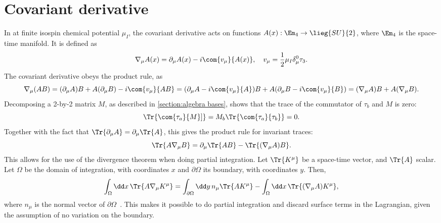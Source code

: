 \section{Covariant derivative}

In \chpt at finite isospin chemical potential $\mu_I$, the covariant derivative acts on functions $A(x): \Em_4 \rightarrow \lieg{SU}{2}$, where $\Em_4$ is the space-time manifold. It is defined as 
\begin{equation}
    \nabla_\mu A(x) = \partial_\mu A(x) - i \com{v_\mu}{A(x)}, 
    \quad v_\mu = \frac{1}{2} \mu_I \delta_\mu^0 \tau_3.
\end{equation}
The covariant derivative obeys the product rule, as
\begin{equation*}
    \nabla_\mu (A B) 
    = (\partial_\mu A) B + A (\partial_\mu B) - i \com{v_\mu}{AB}
    = (\partial_\mu A - i \com{v_\mu}{A})B + A(\partial_\mu B- i \com{v_\mu}{B}) 
    = (\nabla_\mu A)B + A (\nabla_\mu B).
\end{equation*}
Decomposing a 2-by-2 matrix $M$, as described in \autoref{section:algebra bases}, shows that the trace of the commutator of $\tau_b$ and $M$ is zero:
\begin{equation*}
    \Tr{\com{\tau_a}{M}]} = M_b\Tr{ \com{\tau_a}{\tau_b}} = 0.
\end{equation*}
Together with the fact that $\Tr{\partial_\mu A} = \partial_\mu \Tr{A}$, this gives the product rule for invariant traces:
\begin{equation*}
    \Tr{A \nabla_\mu B} = \partial_\mu \Tr{AB} - \Tr{(\nabla_\mu A) B}.
\end{equation*}
This allows for the use of the divergence theorem when doing partial integration.
Let $\Tr{K^\mu}$ be a space-time vector, and $\Tr{A}$ scalar. 
Let $\Omega$ be the domain of integration, with coordinates $x$ and $\partial \Omega$ its boundary, with coordinates $y$. Then, 
\begin{align*}
    \int_\Omega \dd x \, \Tr{A \nabla_\mu K^\mu} = \int_{\partial\Omega} \dd y\, n_\mu \Tr{A K^\mu} - \int_\Omega \dd x \, \Tr{(\nabla_\mu A) K^\mu},
\end{align*}
where $n_\mu$ is the normal vector of $\partial \Omega$~\cite{Carroll:space-time}.
This makes it possible to do partial integration and discard surface terms in the \chpt Lagrangian, given the assumption of no variation on the boundary.
